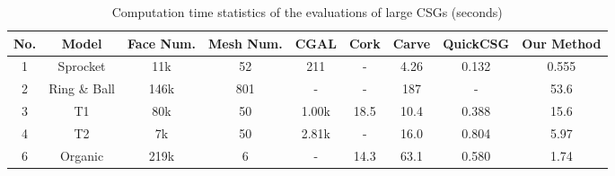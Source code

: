 \begin{table*}[ht]
\caption{Computation time statistics of the evaluations of large CSGs (seconds)}
\label{tab:performance2}
\centering
\begin{tabular}{*{8}{c|}c}%
\hline
{No.} & {Model} & {Face Num.} & {Mesh Num.} &
CGAL  & Cork & Carve & QuickCSG & Our Method
\\
\hline\hline
1 & Sprocket & 11k & 52 & 211  & - & 4.26 & 0.132 & 0.555\\
2 & Ring \& Ball & 146k & 801 & -  & - & 187 & - & 53.6\\
3 & T1 & 80k & 50 & 1.00k & 18.5 & 10.4 & 0.388 & 15.6\\
4 & T2 & 7k & 50 & 2.81k & - & 16.0 & 0.804 & 5.97 \\
6 & Organic & 219k & 6 & - & 14.3 & 63.1 & 0.580 & 1.74\\
\hline
\end{tabular}
\begin{flushleft}
\end{flushleft}
\end{table*}



